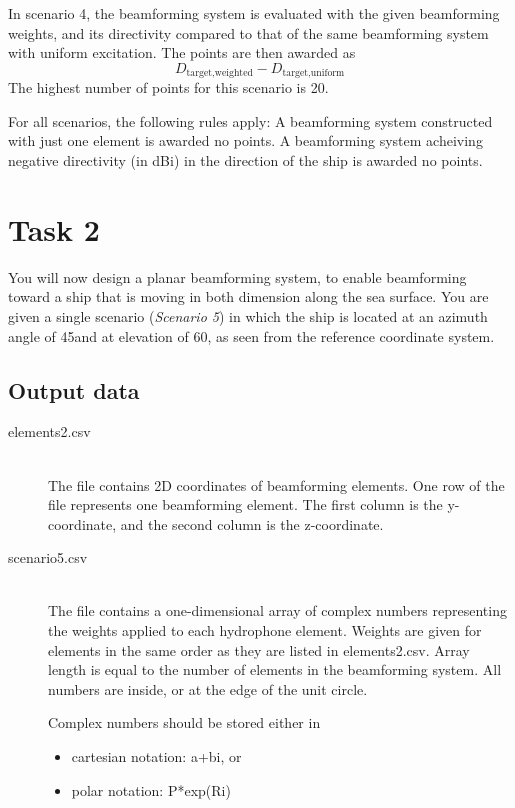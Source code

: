 \documentclass{article}[a4paper]
\begin{document}
In scenario 4, the beamforming system is evaluated with the given beamforming weights, and its directivity compared to that of the same beamforming system with uniform excitation. The points are then awarded as
\[ D_\textrm{target,weighted} - D_\textrm{target,uniform} \]
The highest number of points for this scenario is 20.

For all scenarios, the following rules apply: A beamforming system constructed with just one element is awarded no points. A beamforming system acheiving negative directivity (in dBi) in the direction of the ship is awarded no points.

\section*{Task 2}

You will now design a planar beamforming system, to enable beamforming toward a ship that is moving in both dimension along the sea surface. You are given a single scenario (\textit{Scenario 5}) in which the ship is located at an azimuth angle of 45\textdegree and at elevation of 60\textdegree, as seen from the reference coordinate system.

\subsection*{Output data}

\begin{description}
	\item[elements2.csv] \,\\ The file contains 2D coordinates of beamforming elements. One row of the file represents one beamforming element. The first column is the y-coordinate, and the second column is the z-coordinate.
	
	\item[scenario5.csv] \,\\ The file contains a one-dimensional array of complex numbers representing the weights applied to each hydrophone element. Weights are given for elements in the same order as they are listed in \textsf{elements2.csv}. Array length is equal to the number of elements in the beamforming system. All numbers are inside, or at the edge of the unit circle.
	
	Complex numbers should be stored either in
	\begin{itemize}
		\item cartesian notation: \textsf{a+bi}, or
		\item polar notation: \textsf{P*exp(Ri)}
	\end{itemize}
\end{description}
\end{document}
